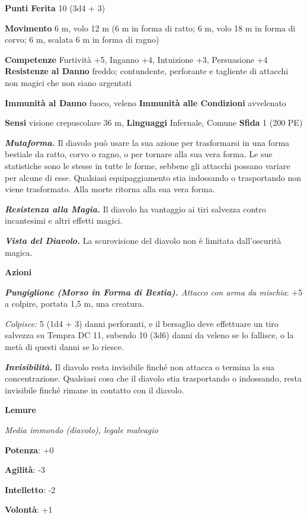 \begin{multicols}{2}
\textbf{Punti Ferita} 10 (3d4 + 3)

\textbf{Movimento} 6 m, volo 12 m (6 m in forma di ratto; 6 m, volo 18 m
in forma di corvo; 6 m, scalata 6 m in forma di ragno)

\textbf{Competenze} Furtività +5, Inganno +4, Intuizione +3, Persuasione +4
\textbf{Resistenze al Danno} freddo; contundente, perforante e tagliente
di attacchi non magici che non siano argentati

\textbf{Immunità al Danno} fuoco, veleno \textbf{Immunità alle
Condizioni} avvelenato

\textbf{Sensi} visione crepuscolare 36 m, 
\textbf{Linguaggi} Infernale, Comune \textbf{Sfida} 1 (200 PE)

\emph{\textbf{Mutaforma.}} Il diavolo può usare la sua azione per
trasformarsi in una forma bestiale da ratto, corvo o ragno, o per
tornare alla sua vera forma. Le sue statistiche sono le stesse in tutte
le forme, sebbene gli attacchi possano variare per alcune di esse.
Qualsiasi equipaggiamento stia indossando o trasportando non viene
trasformato. Alla morte ritorna alla sua vera forma.

\emph{\textbf{Resistenza alla Magia.}} Il diavolo ha vantaggio ai tiri
salvezza contro incantesimi e altri effetti magici.

\emph{\textbf{Vista del Diavolo.}} La scurovisione del diavolo non è
limitata dall'oscurità magica.

\textbf{Azioni}

\emph{\textbf{Pungiglione (Morso in Forma di Bestia).} Attacco con arma
da mischia}: +5 a colpire, portata 1,5 m, una creatura.

\emph{Colpisce:} 5 (1d4 + 3) danni perforanti, e il bersaglio deve
effettuare un tiro salvezza su Tempra DC 11, subendo 10 (3d6)
danni da veleno se lo fallisce, o la metà di questi danni se lo riesce.

\emph{\textbf{Invisibilità.}} Il diavolo resta invisibile finché non
attacca o termina la sua concentrazione. Qualsiasi cosa che il diavolo
stia trasportando o indossando, resta invisibile finché rimane in
contatto con il diavolo.

\textbf{Lemure}

\emph{Media immondo (diavolo), legale malvagio}

\textbf{Potenza}: +0

\textbf{Agilità}: -3

\textbf{Intelletto}: -2

\textbf{Volontà}: +1


\end{multicols}
